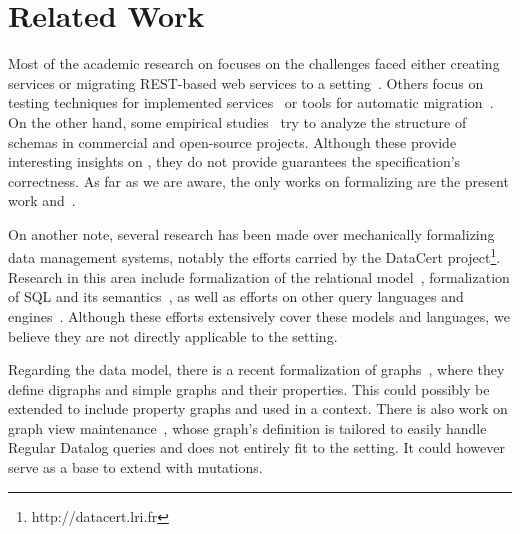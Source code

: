 \section{Related Work}\label{sec:related}

Most of the academic research on \gql focuses on the challenges faced either creating \gql services or migrating REST-based web services to a \gql setting~\cite{improvingoeeu, ehriapi, gqlexperiences}. 
Others focus on testing techniques for implemented \gql services~\cite{gqldeviation} or tools for automatic migration~\cite{migratingapi}. 
On the other hand, some empirical studies~\cite{empiricalgql, empiricalapi} try to analyze the structure of schemas in commercial and open-source projects. 
Although these provide interesting insights on \gql, they do not provide guarantees \wrt the specification's correctness. 
As far as we are aware, the only works on formalizing \gql are the present work and~\cite{gqlph}.

On another note, several research has been made over mechanically formalizing data management systems, notably the efforts carried by the DataCert project\footnote{http://datacert.lri.fr}. 
Research in this area include formalization of the relational model~\cite{relationalcoq}, formalization of SQL and its semantics~\cite{sqlequiv, hottsql, vesqlengines, vesqlsemantics}, 
as well as efforts on other query languages and engines~\cite{certifdatalog, nosql}. Although these efforts extensively cover these models and languages, we believe they are 
not directly applicable to the \gql setting. 

Regarding the data model, there is a recent formalization of graphs~\cite{graphtheory}, where they define digraphs and simple graphs and their properties.
This could possibly be extended to include property graphs and used in a \gcoql context.
There is also work on graph view maintenance~\cite{graphviewmaint}, whose graph's definition is tailored to easily handle Regular Datalog queries and does not entirely fit to the \gql setting.
It could however serve as a base to extend \gcoql with mutations. 

